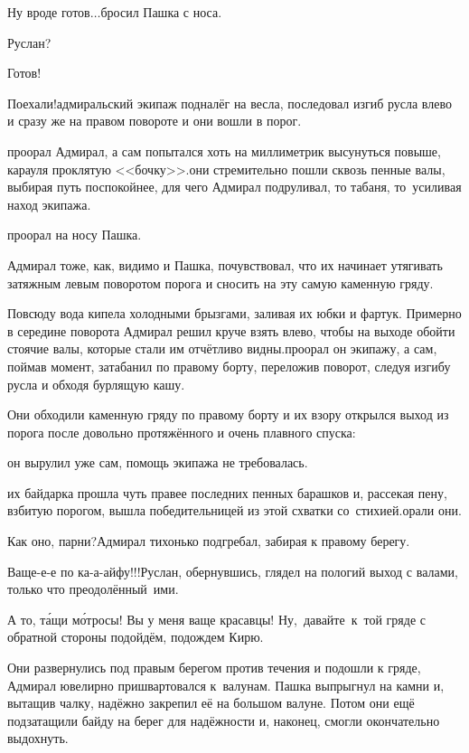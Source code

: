 \diagdash Ну вроде готов$\ldots$\mdash бросил Пашка с носа.

\diagdash Руслан?

\diagdash Готов!

\diagdash Поехали!\mdash адмиральский экипаж подналёг на весла, последовал изгиб русла влево и сразу же на правом повороте и они вошли в порог.

\mdash проорал Адмирал, а сам попытался хоть на миллиметрик высунуться повыше, карауля проклятую <<бочку>>.\mdash они стремительно пошли сквозь пенные валы, выбирая путь поспокойнее, для чего Адмирал подруливал, то табаня, то~усиливая наход экипажа. 

\mdash проорал на носу Пашка.

\mdash Адмирал тоже, как, видимо и Пашка, почувствовал, что их начинает утягивать затяжным левым поворотом порога и сносить на эту самую каменную гряду. 

Повсюду вода кипела холодными брызгами, заливая их юбки и фартук. Примерно в середине поворота Адмирал решил круче взять влево, чтобы на выходе обойти стоячие валы, которые стали им отчётливо видны.\mdash проорал он экипажу, а сам, поймав момент, затабанил по правому борту, переложив поворот, следуя изгибу русла и обходя бурлящую кашу. 

Они обходили каменную гряду по правому борту и их взору открылся выход из порога после довольно протяжённого и очень плавного спуска: 

\mdash он вырулил уже сам, помощь экипажа не требовалась.

\mdash их байдарка прошла чуть правее последних пенных барашков и, рассекая пену, взбитую порогом, вышла победительницей из этой схватки со~стихией.\mdash орали они.

\diagdash Как оно, парни?\mdash Адмирал тихонько подгребал, забирая к правому берегу.

\diagdash Ваще-е-е по ка-а-айфу!!!\mdash Руслан, обернувшись, глядел на пологий выход с валами, только что преодолённый~ими.

\diagdash А то, т\'{а}щи м\'{о}тросы! Вы у меня ваще красавцы! Ну,~давайте~к~той гряде с обратной стороны подойдём, подождем Кирю.

Они развернулись под правым берегом против течения и подошли к гряде, Адмирал ювелирно пришвартовался к~валунам. Пашка выпрыгнул на камни и, вытащив чалку, надёжно закрепил её на большом валуне. Потом они ещё подзатащили байду на берег для надёжности и, наконец, смогли окончательно выдохнуть.

